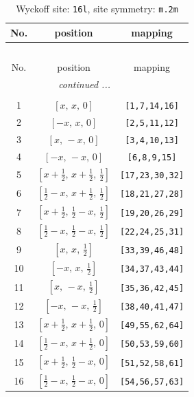 \documentclass[fleqn,8pt]{jsarticle}
\begin{document}
\renewcommand{\arraystretch}{1.2}
\begin{longtable}{ccc}
\caption{Wyckoff site: {\tt 16l}, site symmetry: {\tt m.2m}}
 \\
 \hline \hline
No. & position & mapping \\ \hline \endfirsthead

\multicolumn{2}{l}{\tablename\ \thetable{}} \\
 \hline \hline
No. & position & mapping \\ \hline \endhead

 \hline \hline
\multicolumn{2}{r}{\footnotesize\it continued ...} \\ \endfoot

 \hline \hline
\multicolumn{2}{r}{} \\ \endlastfoot

1 & $\left[ x,\, x,\, 0 \right]$ & {\tt [1,7,14,16]} \\ \hline
2 & $\left[ - x,\, x,\, 0 \right]$ & {\tt [2,5,11,12]} \\ \hline
3 & $\left[ x,\, - x,\, 0 \right]$ & {\tt [3,4,10,13]} \\ \hline
4 & $\left[ - x,\, - x,\, 0 \right]$ & {\tt [6,8,9,15]} \\ \hline
5 & $\left[ x + \frac{1}{2},\, x + \frac{1}{2},\, \frac{1}{2} \right]$ & {\tt [17,23,30,32]} \\ \hline
6 & $\left[ \frac{1}{2} - x,\, x + \frac{1}{2},\, \frac{1}{2} \right]$ & {\tt [18,21,27,28]} \\ \hline
7 & $\left[ x + \frac{1}{2},\, \frac{1}{2} - x,\, \frac{1}{2} \right]$ & {\tt [19,20,26,29]} \\ \hline
8 & $\left[ \frac{1}{2} - x,\, \frac{1}{2} - x,\, \frac{1}{2} \right]$ & {\tt [22,24,25,31]} \\ \hline
9 & $\left[ x,\, x,\, \frac{1}{2} \right]$ & {\tt [33,39,46,48]} \\ \hline
10 & $\left[ - x,\, x,\, \frac{1}{2} \right]$ & {\tt [34,37,43,44]} \\ \hline
11 & $\left[ x,\, - x,\, \frac{1}{2} \right]$ & {\tt [35,36,42,45]} \\ \hline
12 & $\left[ - x,\, - x,\, \frac{1}{2} \right]$ & {\tt [38,40,41,47]} \\ \hline
13 & $\left[ x + \frac{1}{2},\, x + \frac{1}{2},\, 0 \right]$ & {\tt [49,55,62,64]} \\ \hline
14 & $\left[ \frac{1}{2} - x,\, x + \frac{1}{2},\, 0 \right]$ & {\tt [50,53,59,60]} \\ \hline
15 & $\left[ x + \frac{1}{2},\, \frac{1}{2} - x,\, 0 \right]$ & {\tt [51,52,58,61]} \\ \hline
16 & $\left[ \frac{1}{2} - x,\, \frac{1}{2} - x,\, 0 \right]$ & {\tt [54,56,57,63]} \\
\end{longtable}
\end{document}
